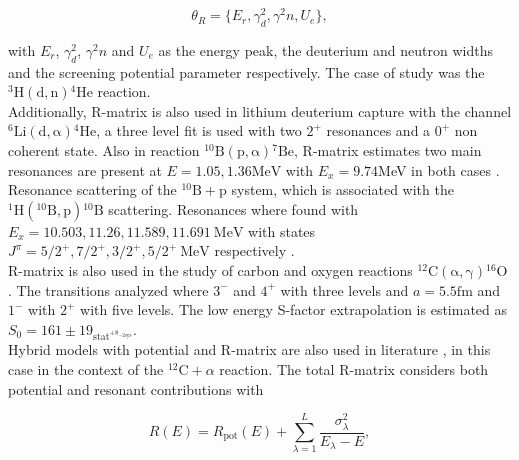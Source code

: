\documentclass[openany]{book}
\begin{document}
\begin{equation}\label{eq:rmatrix_parameterSet}
	\theta_{R} = \{E_r, \gamma^{2}_d, \gamma^{2}n, U_e\},
\end{equation}

with $E_r$, $\gamma^{2}_d$, $\gamma^{2}n$ and $U_e$ as the energy peak, the deuterium and neutron widths and the screening potential parameter respectively. The case of study was the $\mathrm{{}^{3}H(d, n){}^{4}He}$ reaction.\\

Additionally, R-matrix is also used in lithium deuterium capture \cite{grineviciute_lamia_mukhamedzhanov_spitaleri_lacognata_2015} with the channel $\mathrm{{}^{6}Li(d, \alpha){}^{4}He}$, a three level fit is used with two $2^{+}$ resonances and a $0^{+}$ non coherent state. Also in reaction $\mathrm{{}^{10}B(p, \alpha){}^{7}Be}$, R-matrix estimates two main resonances are present at $E = 1.05, 1.36\mathrm{MeV}$ with $E_x = 9.74$MeV in both cases \cite{kolk_macon_deboer_anderson_boeltzig_brandenburg_brune_chen_clark_danley_et_2022, sieverding_randhawa_zetterberg_deboer_ahn_mancino_martinez-pinedo_hix_2022}. Resonance scattering of the $\mathrm{{}^{10}B + p}$ system,  which is associated with the $\mathrm{{}^{1}H({}^{10}B, p){}^{10}B}$ scattering. Resonances where found with $E_x = 10.503, 11.26, 11.589, 11.691 \ \mathrm{MeV}$ with states $J^{\pi} = 5/2^{+}, 7/2^{+}, 3/2^{+}, 5/2^{+} \ \mathrm{MeV}$ respectively \cite{kaur_guimaraes_zamora_assuncao_alcantara-nunez_delara_zevallos_ribeiro_lichtenthaler_pires_et_2022}. \\

R-matrix is also used in the study of carbon and oxygen reactions  $\mathrm{{}^{12}C(\alpha, \gamma){}^{16}O}$ \cite{schurmann_gialanella_kunz_strieder_2012}. The transitions analyzed where $3^{-}$ and $4^{+}$ with three levels and $a = 5.5\mathrm{fm}$ and $1^{-}$ with ${2}^{+}$ with five levels. The low energy S-factor extrapolation is estimated as $S_0 = 161 \pm 19_{\mathrm{stat}^{\mathrm{+8}_{-2\mathrm{sys}}}}$. \\


Hybrid models with potential and R-matrix are also used in literature \cite{sparenberg_2005}, in this case in the context of the $\mathrm{{}^{12}C} + \alpha$ reaction. The total R-matrix considers both potential and resonant contributions with 

\begin{equation}\label{eq:rmatrix_potentialResonant}
	R(E) = 	R_{\mathrm{pot}}(E) + \sum_{\lambda = 1}^{L} \frac{\sigma^2_\lambda}{E_\lambda - E},
\end{equation}
\end{document}
